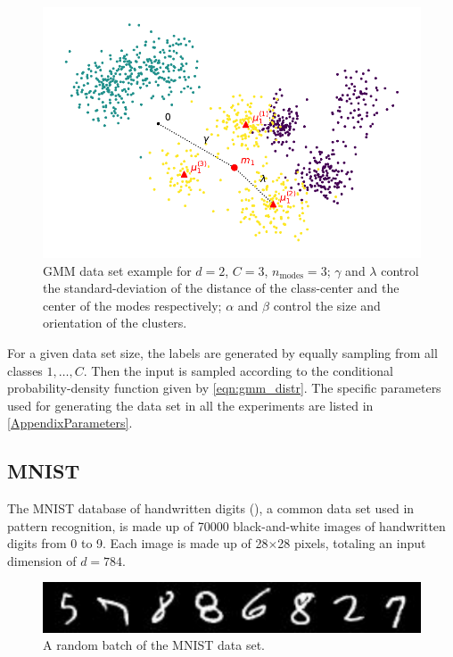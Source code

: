 \begin{figure}[h]
    \centering
    \includegraphics{figures/GMM_plot.pdf}
    \caption{GMM data set example for $d=2$, $C=3$, $n_\text{modes}=3$; 
    $\gamma$ and $\lambda$ control the standard-deviation of the distance of the class-center and the center of the modes respectively; $\alpha$ and $\beta$ control the size and orientation of the clusters.}
    \label{fig:GMM_plot}
\end{figure}

For a given data set size, the labels are generated by equally sampling from all classes $1, \ldots, C$.
Then the input is sampled according to the conditional probability-density function given by \cref{eqn:gmm_distr}.
The specific parameters used for generating the data set in all the experiments
are listed in \cref{AppendixParameters}.


\subsection{MNIST}
The MNIST database of handwritten digits (\cite{MNIST}), a common data set used in pattern recognition, is made up of 70000 black-and-white images 
of handwritten digits from 0 to 9. 
Each image is made up of 28$\times$28 pixels, totaling an input dimension of $d=784$.
\begin{figure}[htb]
    \centering
    \includegraphics{figures/MNIST_plot.pdf}
    \caption{A random batch of the MNIST data set.}
    \label{fig:MNIST_plot}
\end{figure}

